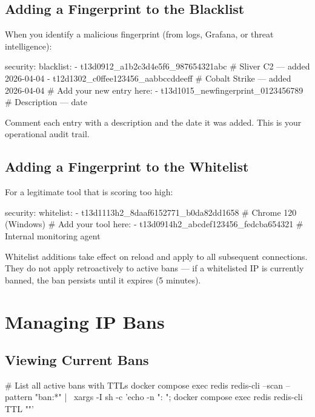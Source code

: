 \subsection{Adding a Fingerprint to the Blacklist}

When you identify a malicious fingerprint (from logs, Grafana, or threat intelligence):

\begin{yamlcode}
security:
  blacklist:
    - t13d0912_a1b2c3d4e5f6_987654321abc  # Sliver C2 — added 2026-04-04
    - t12d1302_c0ffee123456_aabbccddeeff  # Cobalt Strike — added 2026-04-04
    # Add your new entry here:
    - t13d1015_newfingerprint_0123456789  # Description — date
\end{yamlcode}

Comment each entry with a description and the date it was added. This is your
operational audit trail.

\subsection{Adding a Fingerprint to the Whitelist}

For a legitimate tool that is scoring too high:

\begin{yamlcode}
security:
  whitelist:
    - t13d1113h2_8daaf6152771_b0da82dd1658  # Chrome 120 (Windows)
    # Add your tool here:
    - t13d0914h2_abcdef123456_fedcba654321  # Internal monitoring agent
\end{yamlcode}

\begin{warningbox}
Whitelist additions take effect on reload and apply to all subsequent connections.
They do not apply retroactively to active bans — if a whitelisted IP is currently
banned, the ban persists until it expires (5 minutes).
\end{warningbox}

\section{Managing IP Bans}

\subsection{Viewing Current Bans}

\begin{bashcode}
# List all active bans with TTLs
docker compose exec redis redis-cli --scan --pattern "ban:*" | \
  xargs -I{} sh -c 'echo -n "{}: "; docker compose exec redis redis-cli TTL "{}"'
\end{bashcode}

